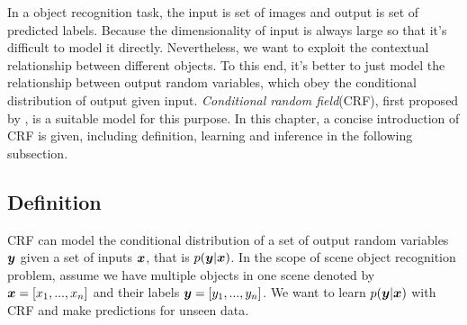 In a object recognition task, the input is set of images and output is set of predicted labels. Because the dimensionality of input is always large so that it's difficult to model it directly. Nevertheless, we want to exploit the contextual relationship between different objects. To this end, it's better to just model the relationship between output random variables, which obey the conditional distribution of output given input. \textit{Conditional random field}(CRF), first proposed by \cite{lafferty2001conditional}, is a suitable model for this purpose. In this chapter, a concise introduction of CRF is given, including definition, learning and inference in the following subsection.

\subsection{Definition}
CRF can model the conditional distribution of a set of output random variables $\boldsymbol y$ given a set of inputs $\boldsymbol x$, that is $p(\boldsymbol y | \boldsymbol x)$. In the scope of scene object recognition problem, assume we have multiple objects in one scene denoted by $\boldsymbol x = [x_1, ..., x_n]$ and their labels $\boldsymbol y = [y_1, ..., y_n]$. We want to learn $p(\boldsymbol y | \boldsymbol x)$ with CRF and make predictions for unseen data.  

